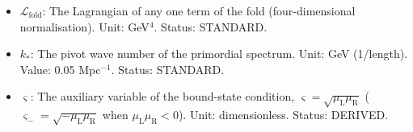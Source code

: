 \documentclass[
  10pt,
]{article}
\begin{document}
\begin{itemize}
  \(\theta_{13} = 8.54^\circ\) (NuFIT 5.2, November 2022, normal
  ordering, the fit without the Super-Kamiokande atmospheric data); the
  Dirac phase is set to zero (ASSUMED; the fit prefers \(197^\circ\)).
  Status: STANDARD, ASSUMED (the phase).
\item
  \(\mathcal{L}_{\mathrm{fold}}\): The Lagrangian of any one term of the
  fold (four-dimensional normalisation). Unit: GeV\(^4\). Status:
  STANDARD.
\item
  \(k_*\): The pivot wave number of the primordial spectrum. Unit: GeV
  (1/length). Value: 0.05 Mpc\(^{-1}\). Status: STANDARD.
\item
  \(\varsigma\): The auxiliary variable of the bound-state condition,
  \(\varsigma = \sqrt{\mu_{\mathrm{L}}\mu_{\mathrm{R}}}\)
  (\(\varsigma_- = \sqrt{-\mu_{\mathrm{L}}\mu_{\mathrm{R}}}\) when
  \(\mu_{\mathrm{L}}\mu_{\mathrm{R}} < 0\)). Unit: dimensionless.
  Status: DERIVED.
\end{itemize}
\end{document}
